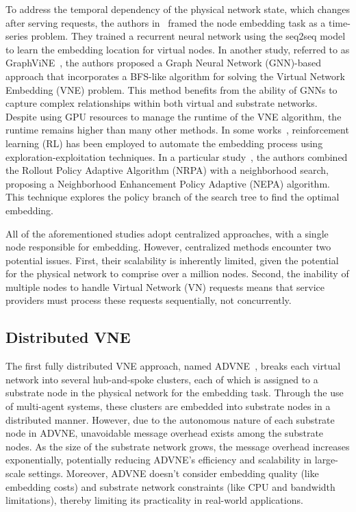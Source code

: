 % 
To address the temporal dependency of the physical network state, which changes after serving requests, the authors in~\cite{Yao_2020_TNSM} framed the node embedding task as a time-series problem. They trained a recurrent neural network using the seq2seq model to learn the embedding location for virtual nodes.
%
In another study, referred to as GraphViNE~\cite{habibi2020graphvine}, the authors proposed a Graph Neural Network (GNN)-based approach that incorporates a BFS-like algorithm for solving the Virtual Network Embedding (VNE) problem. This method benefits from the ability of GNNs to capture complex relationships within both virtual and substrate networks. Despite using GPU resources to manage the runtime of the VNE algorithm, the runtime remains higher than many other methods.
%
In some works~\cite{graphNN_RL, dolati2019deepvine, elkael2022monkey}, reinforcement learning (RL) has been employed to automate the embedding process using exploration-exploitation techniques. In a particular study~\cite{elkael2022monkey}, the authors combined the Rollout Policy Adaptive Algorithm (NRPA) with a neighborhood search, proposing a Neighborhood Enhancement Policy Adaptive (NEPA) algorithm. This technique explores the policy branch of the search tree to find the optimal embedding.
%

All of the aforementioned studies adopt centralized approaches, with a single node responsible for embedding. However, centralized methods encounter two potential issues. First, their scalability is inherently limited, given the potential for the physical network to comprise over a million nodes. Second, the inability of multiple nodes to handle Virtual Network (VN) requests means that service providers must process these requests sequentially, not concurrently.

\subsection{Distributed VNE}
The first fully distributed VNE approach, named ADVNE~\cite{houidi2008distributed}, breaks each virtual network into several hub-and-spoke clusters, each of which is assigned to a substrate node in the physical network for the embedding task. Through the use of multi-agent systems, these clusters are embedded into substrate nodes in a distributed manner. However, due to the autonomous nature of each substrate node in ADVNE, unavoidable message overhead exists among the substrate nodes. As the size of the substrate network grows, the message overhead increases exponentially, potentially reducing ADVNE's efficiency and scalability in large-scale settings. Moreover, ADVNE doesn't consider embedding quality (like embedding costs) and substrate network constraints (like CPU and bandwidth limitations), thereby limiting its practicality in real-world applications.



